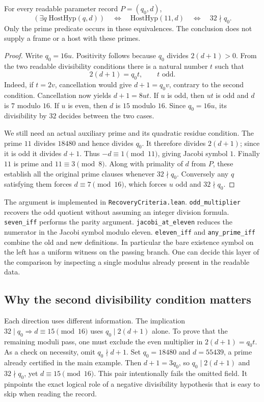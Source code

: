 \documentclass[12pt,letterpaper]{article}
\newcommand{\id}[1]{{\small\nolinkurl{#1}}}
\begin{document}
\begin{theorem}\label{thm:prime}
For every readable parameter record $P=(q_0,d)$,
\[
 (\exists q\;\mathrm{HostHyp}(q,d))
 \quad\Longleftrightarrow\quad \mathrm{HostHyp}(11,d)
 \quad\Longleftrightarrow\quad 32\nmid q_0.
\]
Only the prime predicate occurs in these equivalences. The conclusion does not supply a frame or a host with these primes.
\end{theorem}

\begin{proof}
Write $q_0=16u$. Positivity follows because $q_0$ divides $2(d+1)>0$. From the two readable divisibility conditions there is a natural number $t$ such that
\[
                 2(d+1)=q_0t,\qquad t\text{ odd}.
\]
Indeed, if $t=2v$, cancellation would give $d+1=q_0v$, contrary to the second condition. Cancellation now yields $d+1=8ut$. If $u$ is odd, then $ut$ is odd and $d$ is $7$ modulo $16$. If $u$ is even, then $d$ is $15$ modulo $16$. Since $q_0=16u$, its divisibility by $32$ decides between the two cases.

We still need an actual auxiliary prime and its quadratic residue condition. The prime $11$ divides $18480$ and hence divides $q_0$. It therefore divides $2(d+1)$; since it is odd it divides $d+1$. Thus $-d\equiv1\pmod{11}$, giving Jacobi symbol $1$. Finally $11$ is prime and $11\equiv3\pmod8$. Along with primality of $d$ from $P$, these establish all the original prime clauses whenever $32\nmid q_0$. Conversely any $q$ satisfying them forces $d\equiv7\pmod{16}$, which forces $u$ odd and $32\nmid q_0$.
\end{proof}

The argument is implemented in \id{RecoveryCriteria.lean}. \id{odd_multiplier} recovers the odd quotient without assuming an integer division formula. \id{seven_iff} performs the parity argument. \id{jacobi_at_eleven} reduces the numerator in the Jacobi symbol modulo eleven. \id{eleven_iff} and \id{any_prime_iff} combine the old and new definitions. In particular the bare existence symbol on the left has a uniform witness on the passing branch. One can decide this layer of the comparison by inspecting a single modulus already present in the readable data.

\subsection{Why the second divisibility condition matters}
Each direction uses different information. The implication $32\mid q_0\Rightarrow d\equiv15\pmod{16}$ uses $q_0\mid2(d+1)$ alone. To prove that the remaining moduli pass, one must exclude the even multiplier in $2(d+1)=q_0t$. As a check on necessity, omit $q_0\nmid d+1$. Set $q_0=18480$ and $d=55439$, a prime already certified in the main example. Then $d+1=3q_0$, so $q_0\mid 2(d+1)$ and $32\nmid q_0$, yet $d\equiv15\pmod{16}$. This pair intentionally fails the omitted field. It pinpoints the exact logical role of a negative divisibility hypothesis that is easy to skip when reading the record.
\end{document}
